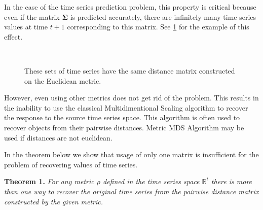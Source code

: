 \documentclass{article}
\begin{document}
In the case of the time series prediction problem, this property is critical because even if the matrix $\mathbf{\Sigma}$ is predicted accurately, there are infinitely many time series values at time $t+1$ corresponding to this matrix. See \ref{fig:fig1} for the example of this effect.
\begin{figure}[H]
	\centering
	\\
	\caption{These sets of time series have the same distance matrix constructed on the Euclidean metric.}
	\label{fig:fig1}
\end{figure}

However, even using other metrics does not get rid of the problem. This results in the inability to use the classical Multidimentional Scaling \cite{MDS} algorithm to recover the response to the source time series space. This algorithm is often used to recover objects from their pairwise distances. Metric MDS Algorithm  \cite{inbook} may be used if distances are not euclidean.

In the theorem below we show that usage of only one matrix is insufficient for the problem of recovering values of time series.

\textbf{Theorem 1.} \textit{For any metric $\rho$ defined in the time series space $\mathbb{R}^t$ there is more than one way to recover the original time series from the pairwise distance matrix constructed by the given metric.}	
\end{document}
